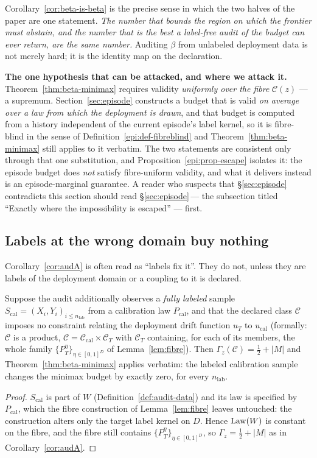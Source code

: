 \noindent Corollary~\ref{cor:beta-is-beta} is the precise sense in which the two halves of
the paper are one statement. \emph{The number that bounds the region on which the frontier
must abstain, and the number that is the best a label-free audit of the budget can ever
return, are the same number.} Auditing $\beta$ from unlabeled deployment data is not merely
hard; it is the identity map on the declaration.

\medskip
\noindent\textbf{The one hypothesis that can be attacked, and where we attack it.}
Theorem~\ref{thm:beta-minimax} requires validity \emph{uniformly over the fibre}
$\mathcal C(z)$ --- a supremum. Section~\ref{sec:episode} constructs a budget that is valid
\emph{on average over a law from which the deployment is drawn}, and that budget is computed
from a history independent of the current episode's label kernel, so it is fibre-blind in the
sense of Definition~\ref{epi:def-fibreblind} and Theorem~\ref{thm:beta-minimax} still applies
to it verbatim. The two statements are consistent only through that one substitution, and
Proposition~\ref{epi:prop-escape} isolates it: the episode budget does \emph{not} satisfy
fibre-uniform validity, and what it delivers instead is an episode-marginal guarantee. A
reader who suspects that \S\ref{sec:episode} contradicts this section should read
\S\ref{sec:episode}\,--- the subsection titled ``Exactly where the impossibility is escaped''
--- first.

\subsection{Labels at the wrong domain buy nothing}

Corollary~\ref{cor:audA} is often read as ``labels fix it''. They do not, unless they are
labels of the deployment domain or a coupling to it is declared.

\begin{theorem}\label{thm:anchor}
Suppose the audit additionally observes a \emph{fully labeled} sample
$S_{\mathrm{cal}}=(X_i,Y_i)_{i\le n_{\mathrm{lab}}}$ from a calibration law
$P_{\mathrm{cal}}$, and that the declared class $\mathcal C$ imposes no constraint relating
the deployment drift function $u_T$ to $u_{\mathrm{cal}}$ (formally: $\mathcal C$ is a product,
$\mathcal C=\mathcal C_{\mathrm{cal}}\times\mathcal C_T$ with $\mathcal C_T$ containing, for
each of its members, the whole family $\{P_T^\eta\}_{\eta\in[0,1]^D}$ of
Lemma~\ref{lem:fibre}). Then $\Gamma_z(\mathcal C)=\tfrac12+|M|$ and
Theorem~\ref{thm:beta-minimax} applies verbatim: the labeled calibration sample changes the
minimax budget by exactly zero, for every $n_{\mathrm{lab}}$.
\end{theorem}
\begin{proof}
$S_{\mathrm{cal}}$ is part of $W$ (Definition~\ref{def:audit-data}) and its law is specified
by $P_{\mathrm{cal}}$, which the fibre construction of Lemma~\ref{lem:fibre} leaves
untouched: the construction alters only the target label kernel on $D$. Hence
$\mathrm{Law}(W)$ is constant on the fibre, and the fibre still contains
$\{P_T^\eta\}_{\eta\in[0,1]^D}$, so $\Gamma_z=\tfrac12+|M|$ as in
Corollary~\ref{cor:audA}.
\end{proof}

